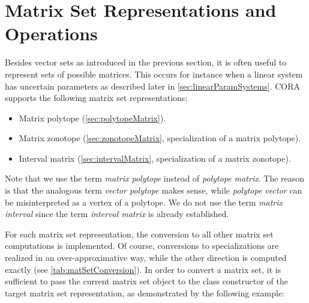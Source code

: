 \section{Matrix Set Representations and Operations} \label{sec:matrixSetRepresentationsAndOperations}

Besides vector sets as introduced in the previous section, it is often useful to represent sets of possible matrices. This occurs for instance when a linear system has uncertain parameters as described later in \cref{sec:linearParamSystems}. CORA supports the following matrix set representations:
\begin{itemize}
    \item Matrix polytope (\cref{sec:polytopeMatrix}).
    \item Matrix zonotope (\cref{sec:zonotopeMatrix}, specialization of a matrix polytope).
    \item Interval matrix (\cref{sec:intervalMatrix}, specialization of a matrix zonotope).
\end{itemize}
Note that we use the term \textit{matrix polytope} instead of \textit{polytope matrix}. The reason is that the analogous term \textit{vector polytope} makes sense, while \textit{polytope vector} can be misinterpreted as a vertex of a polytope. We do not use the term \textit{matrix interval} since the term \textit{interval matrix} is already established.

For each matrix set representation, the conversion to all other matrix set computations is implemented. Of course, conversions to specializations are realized in an over-approximative way, while the other direction is computed exactly (see \cref{tab:matSetConversion}). In order to convert a matrix set, it is sufficient to pass the current matrix set object to the class constructor of the target matrix set representation, as demonstrated by the following example:

    {\footnotesize }

